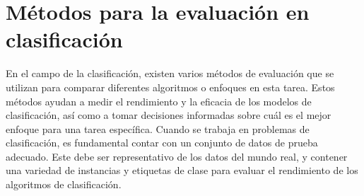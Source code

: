 \section{Métodos para la evaluación en clasificación}
En el campo de la clasificación, existen varios métodos de evaluación que se utilizan para comparar diferentes algoritmos o enfoques en esta tarea. Estos métodos ayudan a medir el rendimiento y la eficacia de los modelos de clasificación, así como a tomar decisiones informadas sobre cuál es el mejor enfoque para una tarea específica. Cuando se trabaja en problemas de clasificación, es fundamental contar con un conjunto de datos de prueba adecuado. Este debe ser representativo de los datos del mundo real, y contener una variedad de instancias y etiquetas de clase para evaluar el rendimiento de los algoritmos de clasificación.

